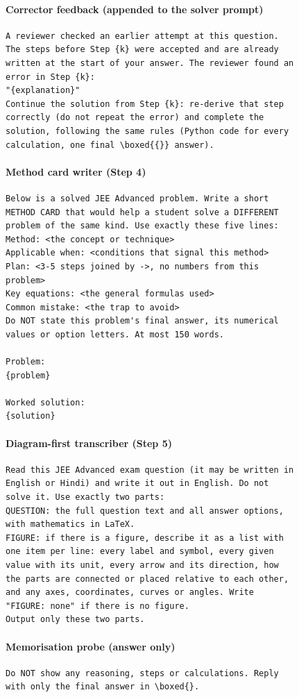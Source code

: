 \paragraph{Corrector feedback (appended to the solver prompt)}
\begin{scriptsize}\begin{verbatim}
A reviewer checked an earlier attempt at this question.
The steps before Step {k} were accepted and are already
written at the start of your answer. The reviewer found an
error in Step {k}:
"{explanation}"
Continue the solution from Step {k}: re-derive that step
correctly (do not repeat the error) and complete the
solution, following the same rules (Python code for every
calculation, one final \boxed{{}} answer).
\end{verbatim}\end{scriptsize}

\paragraph{Method card writer (Step 4)}
\begin{scriptsize}\begin{verbatim}
Below is a solved JEE Advanced problem. Write a short
METHOD CARD that would help a student solve a DIFFERENT
problem of the same kind. Use exactly these five lines:
Method: <the concept or technique>
Applicable when: <conditions that signal this method>
Plan: <3-5 steps joined by ->, no numbers from this
problem>
Key equations: <the general formulas used>
Common mistake: <the trap to avoid>
Do NOT state this problem's final answer, its numerical
values or option letters. At most 150 words.

Problem:
{problem}

Worked solution:
{solution}
\end{verbatim}\end{scriptsize}

\paragraph{Diagram-first transcriber (Step 5)}
\begin{scriptsize}\begin{verbatim}
Read this JEE Advanced exam question (it may be written in
English or Hindi) and write it out in English. Do not
solve it. Use exactly two parts:
QUESTION: the full question text and all answer options,
with mathematics in LaTeX.
FIGURE: if there is a figure, describe it as a list with
one item per line: every label and symbol, every given
value with its unit, every arrow and its direction, how
the parts are connected or placed relative to each other,
and any axes, coordinates, curves or angles. Write
"FIGURE: none" if there is no figure.
Output only these two parts.
\end{verbatim}\end{scriptsize}

\paragraph{Memorisation probe (answer only)}
\begin{scriptsize}\begin{verbatim}
Do NOT show any reasoning, steps or calculations. Reply
with only the final answer in \boxed{}.
\end{verbatim}\end{scriptsize}
